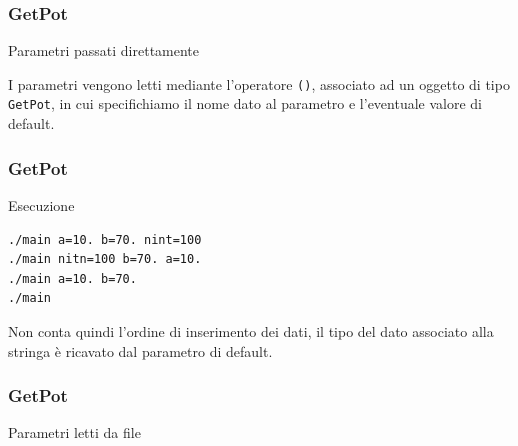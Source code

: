 \documentclass{beamer}
\begin{document}

\begin{frame}[fragile]

    \frametitle{GetPot}

    \begin{block}{Parametri passati direttamente}
        \lstset{basicstyle=\scriptsize\sf}
            
        \lstset{basicstyle=\sf}
    \end{block}

    \vspace{.2cm}

    \begin{block}{ }
        I parametri vengono letti mediante l'operatore \texttt{()}, associato ad un oggetto
        di tipo \texttt{GetPot}, in cui specifichiamo il nome dato al parametro e l'eventuale
        valore di default.
    \end{block}

\end{frame}


\begin{frame}[fragile]

    \frametitle{GetPot}

        \begin{block}{Esecuzione}
            \begin{verbatim}
./main a=10. b=70. nint=100
./main nitn=100 b=70. a=10.
./main a=10. b=70.
./main
            \end{verbatim}
        \end{block}

    \begin{block}{ }
        Non conta quindi l'ordine di inserimento dei dati, il tipo del dato
        associato alla stringa \`e ricavato dal parametro di default.
    \end{block}

\end{frame}


\begin{frame}[fragile]

    \frametitle{GetPot}

    \begin{block}{Parametri letti da file}
        
    \end{block}

\end{frame}
\end{document}
